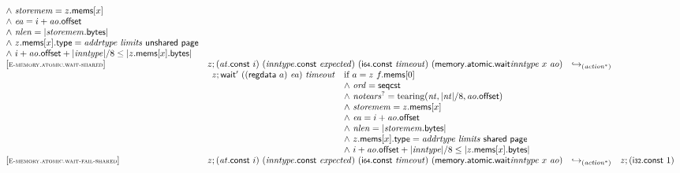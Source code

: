 $$\begin{array}[t]{@{}lrcl@{}l@{}}
\begin{array}[t]{@{}l@{}}
{\land}~ {\mathit{storemem}} = z{.}\mathsf{mems}{}[x] \\
{\land}~ {\mathit{ea}} = i + {\mathit{ao}}{.}\mathsf{offset} \\
{\land}~ {\mathit{nlen}} = {|{\mathit{storemem}}{.}\mathsf{bytes}|} \\
{\land}~ z{.}\mathsf{mems}{}[x]{.}\mathsf{type} = {\mathit{addrtype}}~{\mathit{limits}}~\mathsf{unshared}~\mathsf{page} \\
{\land}~ i + {\mathit{ao}}{.}\mathsf{offset} + {|{\mathit{inntype}}|} / 8 \leq {|z{.}\mathsf{mems}{}[x]{.}\mathsf{bytes}|} \\
\end{array} \\
{[\textsc{\scriptsize E{-}memory.atomic.wait{-}shared}]} \quad & z ; ({\mathit{at}}{.}\mathsf{const}~i)~({\mathit{inntype}}{.}\mathsf{const}~{\mathit{expected}})~(\mathsf{i{\scriptstyle 64}}{.}\mathsf{const}~{\mathit{timeout}})~({\mathsf{memory{.}atomic{.}wait}}{{\mathit{inntype}}}~x~{\mathit{ao}}) & {\hookrightarrow}_{({{\mathit{action}}^\ast})} {} & & \\
& \multicolumn{4}{@{}l@{}}{\quad
\begin{array}[t]{@{}l@{}l@{}}
z ; \mathsf{wait'}~((\mathsf{regdata}~a)~{\mathit{ea}})~{\mathit{timeout}} & \quad
\begin{array}[t]{@{}l@{}}
\mbox{if}~ a = z~f{.}\mathsf{mems}{}[0] \\
{\land}~ {\mathit{ord}} = \mathsf{seqcst} \\
{\land}~ {{\mathit{notears}}^?} = {\mathrm{tearing}}({\mathit{nt}}, {|{\mathit{nt}}|} / 8, {\mathit{ao}}{.}\mathsf{offset}) \\
{\land}~ {\mathit{storemem}} = z{.}\mathsf{mems}{}[x] \\
{\land}~ {\mathit{ea}} = i + {\mathit{ao}}{.}\mathsf{offset} \\
{\land}~ {\mathit{nlen}} = {|{\mathit{storemem}}{.}\mathsf{bytes}|} \\
{\land}~ z{.}\mathsf{mems}{}[x]{.}\mathsf{type} = {\mathit{addrtype}}~{\mathit{limits}}~\mathsf{shared}~\mathsf{page} \\
{\land}~ i + {\mathit{ao}}{.}\mathsf{offset} + {|{\mathit{inntype}}|} / 8 \leq {|z{.}\mathsf{mems}{}[x]{.}\mathsf{bytes}|} \\
\end{array} \\
\end{array}
} \\
{[\textsc{\scriptsize E{-}memory.atomic.wait{-}fail{-}shared}]} \quad & z ; ({\mathit{at}}{.}\mathsf{const}~i)~({\mathit{inntype}}{.}\mathsf{const}~{\mathit{expected}})~(\mathsf{i{\scriptstyle 64}}{.}\mathsf{const}~{\mathit{timeout}})~({\mathsf{memory{.}atomic{.}wait}}{{\mathit{inntype}}}~x~{\mathit{ao}}) & {\hookrightarrow}_{({{\mathit{action}}^\ast})} {} & z ; (\mathsf{i{\scriptstyle 32}}{.}\mathsf{const}~1) & \quad

\end{array}$$
